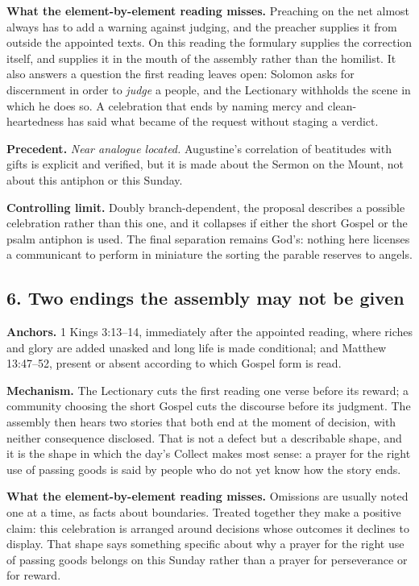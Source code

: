 \textbf{What the element-by-element reading misses.} Preaching on the net almost always has to add a warning against judging, and the preacher supplies it from outside the appointed texts. On this reading the formulary supplies the correction itself, and supplies it in the mouth of the assembly rather than the homilist. It also answers a question the first reading leaves open: Solomon asks for discernment in order to \emph{judge} a people, and the Lectionary withholds the scene in which he does so. A celebration that ends by naming mercy and clean-heartedness has said what became of the request without staging a verdict.

\textbf{Precedent.} \emph{Near analogue located.} Augustine's correlation of beatitudes with gifts is explicit and verified, but it is made about the Sermon on the Mount, not about this antiphon or this Sunday.

\textbf{Controlling limit.} Doubly branch-dependent, the proposal describes a possible celebration rather than this one, and it collapses if either the short Gospel or the psalm antiphon is used. The final separation remains God's: nothing here licenses a communicant to perform in miniature the sorting the parable reserves to angels.

\subsection*{6. Two endings the assembly may not be given}

\textbf{Anchors.} 1 Kings 3:13--14, immediately after the appointed reading, where riches and glory are added unasked and long life is made conditional; and Matthew 13:47--52, present or absent according to which Gospel form is read.

\textbf{Mechanism.} The Lectionary cuts the first reading one verse before its reward; a community choosing the short Gospel cuts the discourse before its judgment. The assembly then hears two stories that both end at the moment of decision, with neither consequence disclosed. That is not a defect but a describable shape, and it is the shape in which the day's Collect makes most sense: a prayer for the right use of passing goods is said by people who do not yet know how the story ends.

\textbf{What the element-by-element reading misses.} Omissions are usually noted one at a time, as facts about boundaries. Treated together they make a positive claim: this celebration is arranged around decisions whose outcomes it declines to display. That shape says something specific about why a prayer for the right use of passing goods belongs on this Sunday rather than a prayer for perseverance or for reward.

